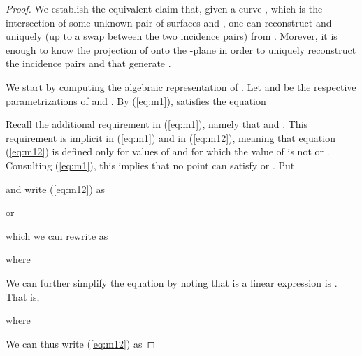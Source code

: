 \documentclass[12pt]{article}
\begin{document}
\begin{proof}
We establish the equivalent claim that, given a curve ,
which is the intersection of some unknown pair of surfaces
 and ,
one can reconstruct  and  uniquely
(up to a swap between the two incidence pairs) from .
Morever, it is enough to know the projection
 of  onto the -plane in order to uniquely
reconstruct the incidence pairs  and  that
generate .

We start by computing the algebraic representation of .
Let  and  be the respective
parametrizations of  and .
By (\ref{eq:m1}),  satisfies the equation

Recall the additional requirement in (\ref{eq:m1}), namely that
 and . This requirement is
implicit in (\ref{eq:m1}) and in (\ref{eq:m12}), meaning that
equation (\ref{eq:m12}) is defined only for values of  and 
for which the value of  is not  or .
Consulting (\ref{eq:m1}), this implies that no point  can satisfy
 or .
Put

and write (\ref{eq:m12}) as

or

which we can rewrite as

where

We can further simplify the equation by noting that
 is a linear expression is . That is,

where

We can thus write (\ref{eq:m12}) as


\end{proof}
\end{document}
